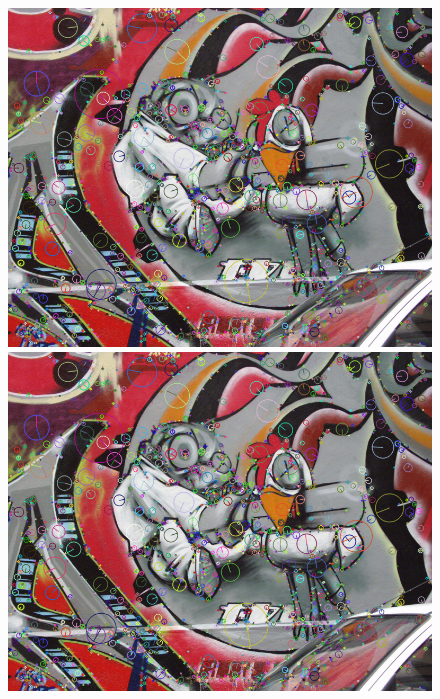 		\begin{figure}[!htb]
				\includegraphics[width=\linewidth]{images/RobotKp}
				\label{fig:awesome_image1}
			\endminipage\hfill
				\includegraphics[width=\linewidth]{images/RobotKp}
				\label{fig:awesome_image2}
			\endminipage\hfill

\end{figure}
